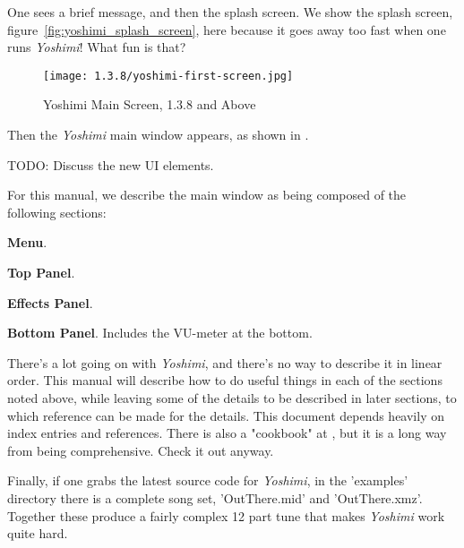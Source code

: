 \documentclass[
 11pt,
 twoside,
 a4paper,
 headinclude,
 footinclude,
 final                                 %
]{article}
\begin{document}
   One sees a brief message, and then the splash screen.
   We show the splash screen, figure~\ref{fig:yoshimi_splash_screen},
   here because it goes away too fast when one runs \textsl{Yoshimi}!
   What fun is that?

\begin{figure}[H]
   \centering 
   \texttt{[image: 1.3.8/yoshimi-first-screen.jpg]}
   \caption{Yoshimi Main Screen, 1.3.8 and Above}
   \label{fig:yoshimi_main_screen}
\end{figure}

   
   Then the \textsl{Yoshimi} main window appears, as shown in
   .

   TODO:  Discuss the new UI elements.

   For this manual, we describe the main window as being composed of
   the following sections:

\begin{enumber}
   \item \textbf{Menu}.
   \item \textbf{Top Panel}.
   \item \textbf{Effects Panel}.
   \item \textbf{Bottom Panel}.  Includes the VU-meter at the bottom.
\end{enumber}

   There's a lot going on with \textsl{Yoshimi}, and there's no way to describe
   it in linear order.  This manual will describe how to do useful things in
   each of the sections noted above, while leaving some of the details to be
   described in later sections, to which reference can be made for the details.
   This document depends heavily on index entries and references.
   There is also a "cookbook" at \cite{book}, but it is a long way from being
   comprehensive.  Check it out anyway.

   Finally, if one grabs the latest source code for \textsl{Yoshimi}, in the
   'examples' directory there is a complete song set, 'OutThere.mid' and
   'OutThere.xmz'. Together these produce a fairly complex 12 part tune that
   makes \textsl{Yoshimi} work quite hard.

\end{document}
